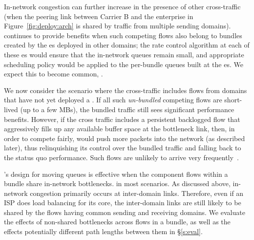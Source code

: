  In-network congestion can further increase in the presence of other cross-traffic (\eg when the peering link between Carrier B and the enterprise in Figure~\ref{fig:deploy:arch} is shared by traffic from multiple sending domains). \name continues to provide benefits when such competing flows also belong to bundles created by the {\inbox}es deployed in other domains; the rate control algorithm at each of these {\inbox}es would ensure that the in-network queues remain small, and appropriate scheduling policy would be applied to the per-bundle queues built at the {\inbox}es.
We expect this to become common, . 

 We now consider the scenario where the cross-traffic includes flows from domains that have not yet deployed a \name. If all such \emph{un-bundled} competing flows are short-lived (up to a few MBs), the bundled traffic still sees significant performance benefits. However, if the cross traffic includes a persistent backlogged flow that aggressively fills up any available buffer space at the bottleneck link, then, in order to compete fairly, \name would push more packets into the network (as described later), thus relinquishing its control over the bundled traffic and falling back to the status quo performance. Such flows are unlikely to arrive very frequently~\cite{caida-dataset}. 


 \name's design for moving queues is  effective when the component flows within a bundle share in-network bottlenecks. 
  in most scenarios. 
As discussed above, in-network congestion primarily occurs at inter-domain links. Therefore, even if an ISP does load balancing for its core, the inter-domain links are still likely to be shared by the flows having common sending and receiving domains. We evaluate the effects of non-shared bottlenecks across flows in a bundle, as well as the effects potentially different path lengths between them in \S\ref{s:eval}. 

